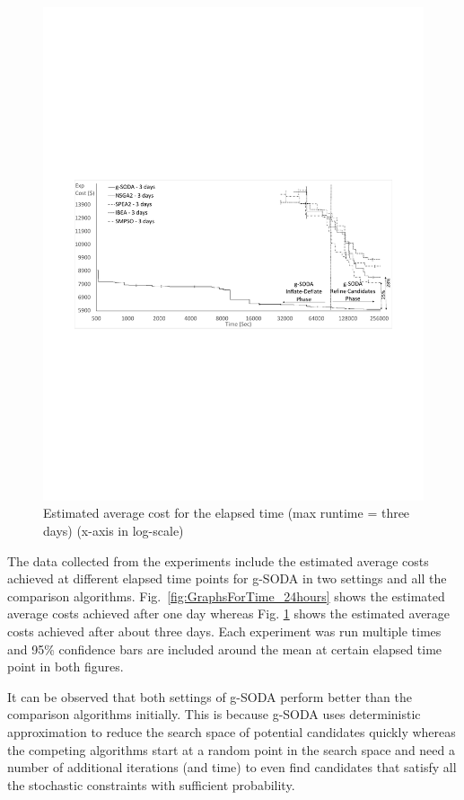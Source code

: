 \documentclass[a4paper, 12pt]{article} %
\begin{document}
\begin{figure}
\begin{minipage}{.5\textwidth}
\begin{center}
	\includegraphics[width=\textwidth]{images/sodavsjmetal3day.pdf}
	\caption{Estimated average cost for the elapsed time (max runtime = three days) (x-axis in log-scale)}
	\label{fig:GraphsForTime_3days}       %
\end{center}
\end{minipage}
\end{figure}

The data collected from the experiments include the estimated average costs achieved at different elapsed time points for g-SODA in two settings and all the comparison algorithms. 
Fig.~\ref{fig:GraphsForTime_24hours} shows the estimated average costs achieved after one day whereas Fig. \ref{fig:GraphsForTime_3days} shows the estimated average costs achieved after about three days. Each experiment was run multiple times and 95\% confidence bars are included around the mean at certain elapsed time point in both figures. 

It can be observed that both settings of g-SODA perform better than the comparison algorithms initially. This is because g-SODA uses deterministic approximation to reduce the search space of potential candidates quickly whereas the competing algorithms start at a random point in the search space and need a number of additional iterations (and time) to even find candidates that satisfy all the stochastic constraints with sufficient probability. 
\end{document}
